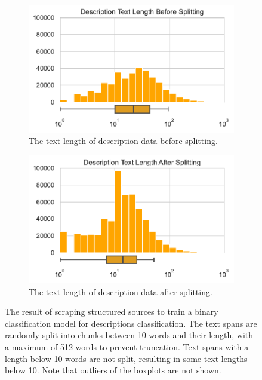 \documentclass[a4paper, 12pt, oneside]{book} %
\begin{document}
\begin{figure} [h!]
\begin{subfigure}[b]{0.49\textwidth}
         \includegraphics[width=\textwidth]{histogram_text_length_2.pdf}
         \caption{The text length of description data before splitting.}
         \label{fig:text_length_2}
     \end{subfigure}
     \hfill
     \begin{subfigure}[b]{0.49\textwidth}
         \centering
         \includegraphics[width=\textwidth]{histogram_text_length_4.pdf}
         \caption{The text length of description data after splitting.}
         \label{fig:text_length_4}
     \end{subfigure}
    \caption[Text length distribution for training web crawler model]{The result of scraping structured sources to train  a binary classification model for descriptions classification. The text spans are randomly split into chunks between 10 words and their length, with a maximum of 512 words to prevent truncation. Text spans with a length below 10 words are not split, resulting in some text lengths below 10. Note that outliers of the boxplots are not shown.}
    \label{fig:text_length_distribution}
\end{figure}
\end{document}
